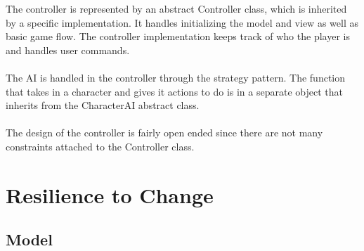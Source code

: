 \documentclass[12pt]{article}
\begin{document}
The controller is represented by an abstract Controller class, which is inherited by a specific implementation. It handles initializing the model and view as well as basic game flow. The controller implementation keeps track of who the player is and handles user commands.\\
\\
The AI is handled in the controller through the strategy pattern. The function that takes in a character and gives it actions to do is in a separate object that inherits from the CharacterAI abstract class.\\
\\
The design of the controller is fairly open ended since there are not many constraints attached to the Controller class.

\section*{Resilience to Change}

\subsection*{Model}
\end{document}
